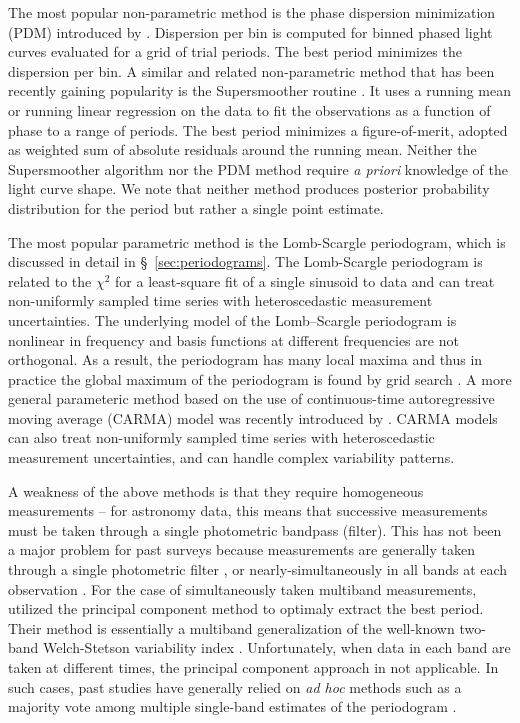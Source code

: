 \documentclass[12pt,preprint]{aastex}
\newcommand{\foreign}[1]{{\it #1}}
\newcommand{\apriori}{\foreign{a priori}}
\newcommand{\adhoc}{\foreign{ad hoc}}
\begin{document}
The most popular non-parametric method is the phase dispersion minimization (PDM) introduced by \cite{PDM1978}. 
Dispersion per bin is computed for binned phased light curves evaluated for a grid of trial periods. The best
period minimizes the dispersion per bin.  A similar and related non-parametric method that has been recently 
gaining popularity is the Supersmoother routine \citep{Reimann94}. It uses a running mean or running linear 
regression on the data to fit the observations as a function of phase to a range of periods. The best period 
minimizes a figure-of-merit, adopted as weighted sum of absolute residuals around the running mean. 
Neither the Supersmoother algorithm nor the PDM method require \apriori{} knowledge of the light curve shape. 
We note that neither method produces posterior probability distribution for the period but rather a single point 
estimate. 

The most popular parametric method is the Lomb-Scargle periodogram, which is discussed in detail in \S~\ref{sec:periodograms}.
The Lomb-Scargle periodogram is related to the $\chi^2$ for a least-square fit of a single sinusoid to data
and can treat non-uniformly sampled time series with heteroscedastic measurement uncertainties. 
The underlying model of the Lomb–Scargle periodogram is nonlinear in frequency and basis functions at different
frequencies are not orthogonal. As a result, the periodogram has many local maxima and thus in practice the global 
maximum of the periodogram is found by grid search \citep[for details see, e.g.][]{ICVG2014}.
A more general parameteric method based on the use of continuous-time autoregressive moving average (CARMA) model
was recently introduced by \citep{Kelly14}. CARMA models can also treat non-uniformly sampled time series with 
heteroscedastic measurement uncertainties, and can handle complex variability patterns. 

A weakness of the above methods is that they require homogeneous measurements -- for astronomy data, this means 
that successive measurements must be taken through a single photometric bandpass (filter). This has not been a major
problem for past surveys because measurements are generally taken through a single photometric filter 
\citep [e.g. LINEAR,][]{LINEAR1}, or nearly-simultaneously in all bands at each observation \citep [e.g. SDSS,][]{Sesar2010}.
For the case of simultaneously taken multiband measurements, \cite{Suveges12} utilized the principal component
method to optimaly extract the best period. Their method is essentially a multiband generalization of the well-known
two-band Welch-Stetson variability index \citep{Stetson1996}. Unfortunately, when data in each band are taken at
different times, the  principal component approach in not applicable. In such cases, past studies have generally relied 
on \adhoc{} methods such as a majority vote among multiple single-band estimates of the 
periodogram \citep[e.g.,][]{Oluseyi12}. 
\end{document}
